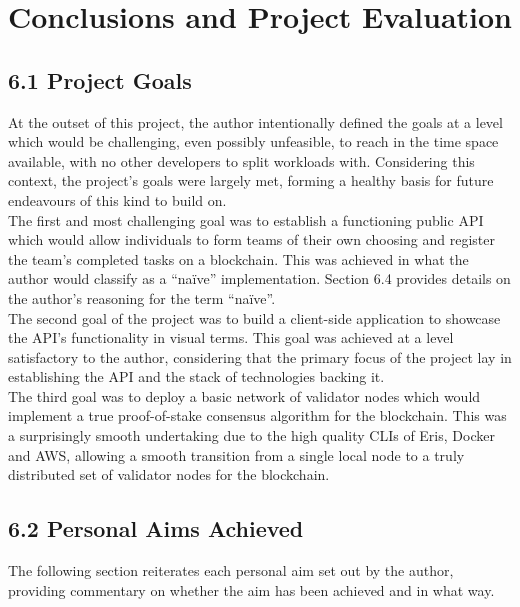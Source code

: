 \documentclass[12pt]{report}
\begin{document}
\section{Conclusions and Project
Evaluation}\label{conclusions-and-project-evaluation}

\subsection{6.1 Project Goals}\label{project-goals-1}

At the outset of this project, the author intentionally defined the
goals at a level which would be challenging, even possibly unfeasible,
to reach in the time space available, with no other developers to split
workloads with. Considering this context, the project's goals were
largely met, forming a healthy basis for future endeavours of this kind
to build on.\\
The first and most challenging goal was to establish a functioning
public API which would allow individuals to form teams of their own
choosing and register the team's completed tasks on a blockchain. This
was achieved in what the author would classify as a ``naïve''
implementation. Section 6.4 provides details on the author's reasoning
for the term ``naïve''.\\
The second goal of the project was to build a client-side application to
showcase the API's functionality in visual terms. This goal was achieved
at a level satisfactory to the author, considering that the primary
focus of the project lay in establishing the API and the stack of
technologies backing it.\\
The third goal was to deploy a basic network of validator nodes which
would implement a true proof-of-stake consensus algorithm for the
blockchain. This was a surprisingly smooth undertaking due to the high
quality CLIs of Eris, Docker and AWS, allowing a smooth transition from
a single local node to a truly distributed set of validator nodes for
the blockchain.

\subsection{6.2 Personal Aims Achieved}\label{personal-aims-achieved}

The following section reiterates each personal aim set out by the
author, providing commentary on whether the aim has been achieved and in
what way.
\end{document}
